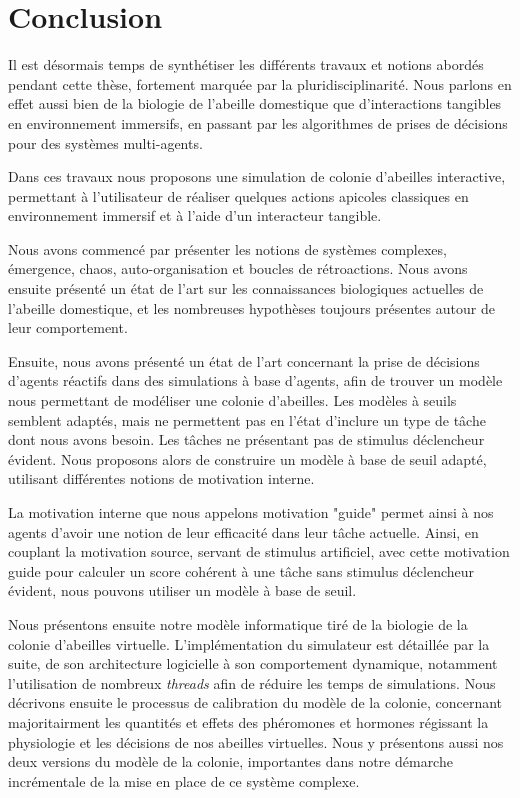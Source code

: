 \chapter*{Conclusion}

Il est désormais temps de synthétiser les différents travaux et notions abordés pendant cette thèse, fortement marquée par la pluridisciplinarité. Nous parlons en effet aussi bien de la biologie de l'abeille domestique que d'interactions tangibles en environnement immersifs, en passant par les algorithmes de prises de décisions pour des systèmes multi-agents.

Dans ces travaux nous proposons une simulation de colonie d'abeilles interactive, permettant à l'utilisateur de réaliser quelques actions apicoles classiques en environnement immersif et à l'aide d'un interacteur tangible.

Nous avons commencé par présenter les notions de systèmes complexes, émergence, chaos, auto-organisation et boucles de rétroactions. Nous avons ensuite présenté un état de l'art sur les connaissances biologiques actuelles de l'abeille domestique, et les nombreuses hypothèses toujours présentes autour de leur comportement.

Ensuite, nous avons présenté un état de l'art concernant la prise de décisions d'agents réactifs dans des simulations à base d'agents, afin de trouver un modèle nous permettant de modéliser une colonie d'abeilles. Les modèles à seuils semblent adaptés, mais ne permettent pas en l'état d'inclure un type de tâche dont nous avons besoin. Les tâches ne présentant pas de stimulus déclencheur évident. Nous proposons alors de construire un modèle à base de seuil adapté, utilisant différentes notions de motivation interne.

La motivation interne que nous appelons motivation "guide" permet ainsi à nos agents d'avoir une notion de leur efficacité dans leur tâche actuelle. Ainsi, en couplant la motivation source, servant de stimulus artificiel, avec cette motivation guide pour calculer un score cohérent à une tâche sans stimulus déclencheur évident, nous pouvons utiliser un modèle à base de seuil.

Nous présentons ensuite notre modèle informatique tiré de la biologie de la colonie d'abeilles virtuelle. L'implémentation du simulateur est détaillée par la suite, de son architecture logicielle à son comportement dynamique, notamment l'utilisation de nombreux \textit{threads} afin de réduire les temps de simulations. Nous décrivons ensuite le processus de calibration du modèle de la colonie, concernant majoritairment les quantités et effets des phéromones et hormones régissant la physiologie et les décisions de nos abeilles virtuelles. Nous y présentons aussi nos deux versions du modèle de la colonie, importantes dans notre démarche incrémentale de la mise en place de ce système complexe.

